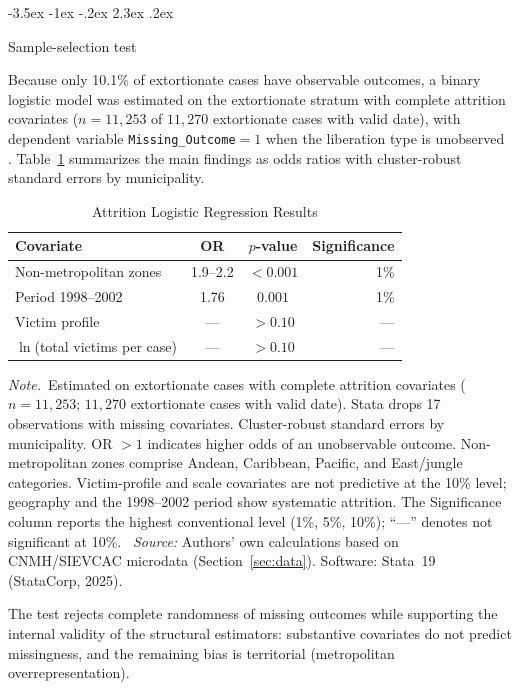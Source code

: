 \documentclass[12pt]{article}
\makeatletter
\numberwithin{equation}{section}
\numberwithin{table}{section}
\renewcommand\section{\@startsection {section}{1}{\z@}%
                                   {-3.5ex \@plus -1ex \@minus -.2ex}%
                                   {2.3ex \@plus.2ex}%
                                   {\normalfont\Large\bfseries\raggedright}}
\newcommand{\tabnote}{\par\addvspace{0.4em}\noindent\emph{Note.}}
\newcommand{\tabsource}{\ \textit{Source:} Authors' own calculations based on
CNMH/SIEVCAC microdata (Section~\ref{sec:data}). Software: Stata~19
(StataCorp, 2025).}
\makeatother
\begin{document}
\section{Sample-selection test}
\label{sec:selection}

Because only 10.1\% of extortionate cases have observable outcomes, a binary
logistic model was estimated on the extortionate stratum with complete
attrition covariates ($n=11{,}253$ of $11{,}270$ extortionate cases with valid
date), with dependent variable \texttt{Missing\_Outcome}${=}1$ when the liberation
type is unobserved \citep{LittleRubin2020}. Table~\ref{tab:attrition} summarizes
the main findings as odds ratios with cluster-robust standard errors by
municipality.

\begin{table}[t]
\centering
\caption{Attrition Logistic Regression Results}
\label{tab:attrition}
\small
\begin{tabular}{@{}lccr@{}}
\toprule
Covariate & OR & $p$-value & Significance \\
\midrule
Non-metropolitan zones & 1.9--2.2 & $<0.001$ & 1\% \\
Period 1998--2002 & 1.76 & $0.001$ & 1\% \\
Victim profile & --- & $>0.10$ & --- \\
$\ln$(total victims per case) & --- & $>0.10$ & --- \\
\bottomrule
\end{tabular}
\tabnote\ Estimated on extortionate cases with complete attrition covariates
($n=11{,}253$; $11{,}270$ extortionate cases with valid date). Stata drops 17
observations with missing covariates. Cluster-robust standard errors by
municipality. OR $>1$ indicates higher odds of an unobservable outcome.
Non-metropolitan zones comprise Andean, Caribbean, Pacific, and East/jungle
categories. Victim-profile and scale covariates are not predictive at the 10\%
level; geography and the 1998--2002 period show systematic attrition. The
Significance column reports the highest conventional level (1\%, 5\%, 10\%);
``---'' denotes not significant at 10\%.
\tabsource
\end{table}

The test rejects complete randomness of missing outcomes while supporting
the internal validity of the structural estimators: substantive covariates do
not predict missingness, and the remaining bias is territorial (metropolitan
overrepresentation).
\end{document}

